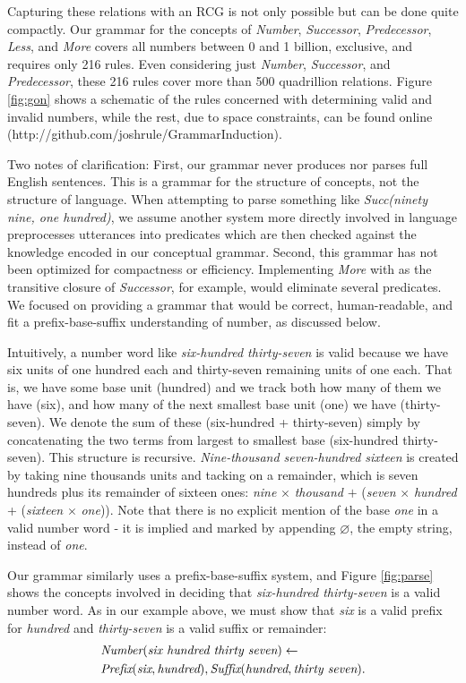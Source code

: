 \documentclass[10pt,letterpaper]{article}
\begin{document}
Capturing these relations with an RCG is not only possible but can
be done quite compactly. Our grammar for the concepts of
\emph{Number}, \emph{Successor}, \emph{Predecessor}, \emph{Less}, and
\emph{More} covers all numbers between 0 and 1 billion, exclusive, and
requires only 216 rules. Even considering just \emph{Number},
\emph{Successor}, and \emph{Predecessor}, these 216 rules cover more
than 500 quadrillion relations. Figure \ref{fig:gon} shows a schematic
of the rules concerned with determining valid and invalid numbers,
while the rest, due to space constraints, can be found
online (http://github.com/joshrule/GrammarInduction).

Two notes of clarification: First, our grammar never produces nor
parses full English sentences. This is a grammar for the structure of
concepts, not the structure of language. When attempting to parse
something like \emph{Succ(ninety nine, one hundred)}, we assume
another system more directly involved in language preprocesses
utterances into predicates which are then checked against the
knowledge encoded in our conceptual grammar. Second, this grammar has
not been optimized for compactness or efficiency. Implementing
\emph{More} with as the transitive closure of \emph{Successor}, for
example, would eliminate several predicates. We focused on providing a
grammar that would be correct, human-readable, and fit a
prefix-base-suffix understanding of number, as discussed below.

Intuitively, a number word like \emph{six-hundred thirty-seven} is
valid because we have six units of one hundred each and thirty-seven
remaining units of one each. That is, we have some base unit (hundred)
and we track both how many of them we have (six), and how many of the
next smallest base unit (one) we have (thirty-seven). We denote the
sum of these (six-hundred + thirty-seven) simply by concatenating the
two terms from largest to smallest base (six-hundred thirty-seven).
This structure is recursive. \emph{Nine-thousand seven-hundred
  sixteen} is created by taking nine thousands units and tacking on a
remainder, which is seven hundreds plus its remainder of sixteen ones:
\emph{nine} $\times$ \emph{thousand} $+$ (\emph{seven} $\times$
\emph{hundred} + (\emph{sixteen} $\times$ \emph{one})). Note that
there is no explicit mention of the base \emph{one} in a valid number
word - it is implied and marked by appending $\varnothing$, the empty
string, instead of \emph{one}.

Our grammar similarly uses a prefix-base-suffix system, and Figure
\ref{fig:parse} shows the concepts involved in deciding that
\emph{six-hundred thirty-seven} is a valid number word. As in our
example above, we must show that \emph{six} is a valid prefix for
\emph{hundred} and \emph{thirty-seven} is a valid suffix or remainder:
\setlength{\jot}{0pt}
\begin{align}
  & \textit{Number}(\textit{six hundred thirty seven}) \leftarrow\\
  & \textit{Prefix}(\textit{six}, \textit{hundred}), \textit{Suffix}(\textit{hundred}, \textit{thirty seven}).\notag
\end{align}
\end{document}
